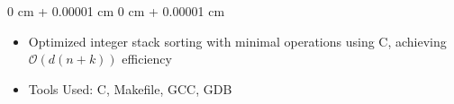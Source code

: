 \documentclass[10pt, letterpaper]{article}
\newenvironment{highlights}{
    \begin{itemize}[
        topsep=0.10 cm,
        parsep=0.10 cm,
        partopsep=0pt,
        itemsep=0pt,
        leftmargin=0 cm + 10pt
    ]
}{
    \end{itemize}
} %
\newenvironment{onecolentry}{
    \begin{adjustwidth}{
        0 cm + 0.00001 cm
    }{
        0 cm + 0.00001 cm
    }
}{
    \end{adjustwidth}
} %
\begin{document}
        \vspace{0.10 cm}
        \begin{onecolentry}
            \begin{highlights}
                \item Optimized integer stack sorting with minimal operations using C, achieving $\mathcal{O}(d(n + k))$ efficiency
                \item Tools Used: C, Makefile, GCC, GDB
            \end{highlights}
        \end{onecolentry}


    
\end{document}
